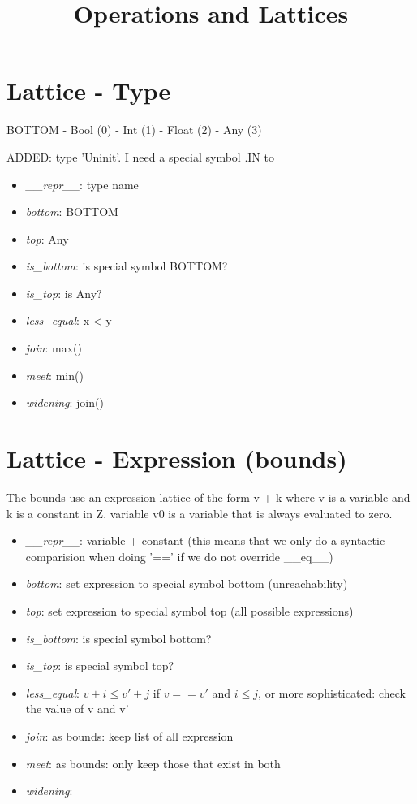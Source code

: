 \documentclass[11pt]{article}
\begin{document}
\title{Operations and Lattices}

\maketitle


\section{Lattice - Type}

BOTTOM - Bool (0) - Int (1) - Float (2) - Any (3)

ADDED: type 'Uninit'. I need a special symbol .IN to 

\begin{itemize}
\item \textit{\_\_repr\_\_}: type name
\item \textit{bottom}: BOTTOM
\item \textit{top}: Any
\item \textit{is\_bottom}: is special symbol BOTTOM?
\item \textit{is\_top}: is Any?
\item \textit{less\_equal}: x < y
\item \textit{join}: max()
\item \textit{meet}: min()
\item \textit{widening}: join()
\end{itemize}

\section{Lattice - Expression (bounds)}

The bounds use an expression lattice of the form v + k where v is a variable and k is a constant in Z. variable v0 is a variable that is always evaluated to zero.

\begin{itemize}
\item \textit{\_\_repr\_\_}: variable + constant (this means that we only do a syntactic comparision when doing '==' if we do not override \_\_eq\_\_)
\item \textit{bottom}: set expression to special symbol bottom (unreachability)
\item \textit{top}: set expression to special symbol top (all possible expressions)
\item \textit{is\_bottom}: is special symbol bottom?
\item \textit{is\_top}: is special symbol top?
\item \textit{less\_equal}: $v + i \leq v' + j$ if $v == v'$ and $i \leq j$, or more sophisticated: check the value of v and v'
\item \textit{join}: as bounds: keep list of all expression
\item \textit{meet}: as bounds: only keep those that exist in both
\item \textit{widening}: 
\end{itemize}
\end{document}
